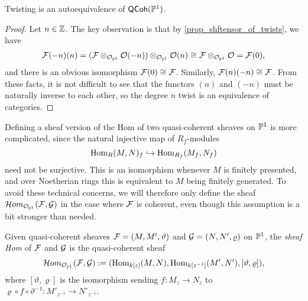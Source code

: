 \begin{proposition}
  \label{prop_twist_is_autoequiv}
  Twisting is an autoequivalence of $\operatorname{\mathsf{QCoh}}(\mathbb{P}^{{1}})$.
\end{proposition}

\begin{proof}
  Let $n \in \mathbb{Z}$.
  The key observation is that by \cref{prop_shftensor_of_twists}, we have
  \begin{align*}
    \mathcal{F}(-n)(n)
    = (\mathcal{F} \otimes_{\mathcal{O}_{{\mathbb{P}^{{1}}}}} \mathcal{O}({-n})) \otimes_{\mathcal{O}_{{\mathbb{P}^{{1}}}}} \mathcal{O}({n})
    \cong \mathcal{F} \otimes_{\mathcal{O}_{{\mathbb{P}^{{1}}}}} \mathcal{O}
    = \mathcal{F}(0),
  \end{align*}
  and there is an obvious isomorphism $\mathcal{F}(0) \cong \mathcal{F}$.
  Similarly, $\mathcal{F}(n)(-n) \cong \mathcal{F}$.
  From these facts, it is not difficult to see that the functors
  $(n)$ and $(-n)$ must be naturally inverse to each other, so the
  degree $n$ twist is an equivalence of categories.
\end{proof}




\iffalse
Defining a sheaf version of the Hom of two quasi-coherent sheaves on
$\mathbb{P}^{{1}}$ is more complicated, since the natural injective map of $R_f$-modules
\[
  \operatorname{Hom}_R(M, N)_f \hookrightarrow \operatorname{Hom}_{R_f}(M_f, N_f)
\]
need not be surjective.
This is an isomorphism whenever $M$ is finitely presented, and over
Noetherian rings this is equivalent to $M$ being finitely generated.
To avoid these technical concerns, we will therefore only define the
sheaf $\mathcal{H}om_{\mathcal{O}_{{\mathbb{P}^{{1}}}}}(\mathcal{F}, \mathcal{G})$ in the case where $\mathcal{F}$ is
coherent, even though this assumption is a bit stronger than needed.

\begin{definition}
  Given quasi-coherent sheaves $\mathcal{F} = (M, M', \vartheta)$ and
  $\mathcal{G} = (N, N', \varrho)$ on $\mathbb{P}^{{1}}$, the \emph{sheaf Hom} of
  $\mathcal{F}$ and $\mathcal{G}$ is the quasi-coherent sheaf
  \[
    \mathcal{H}om_{\mathcal{O}_{{\mathbb{P}^{{1}}}}}(\mathcal{F}, \mathcal{G})
    :=
    (\operatorname{Hom}_{k[z]}(M, N), \operatorname{Hom}_{k[z^{-1}]}(M', N'), [\vartheta, \varrho]),
  \]
  where $[\vartheta, \varrho]$ is the isomorphism sending $f: M_z \to
  N_z$ to $\varrho \circ f \circ \vartheta^{-1}: M'_{z^{-1}} \to N'_{z^{-1}}$.
\end{definition}

